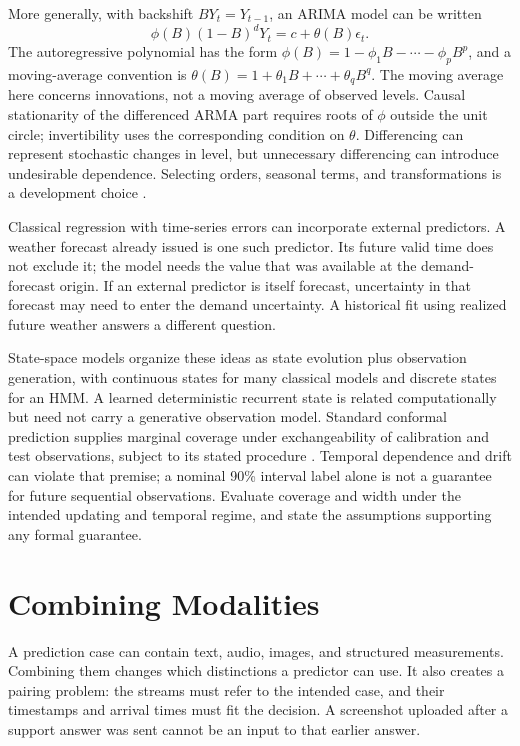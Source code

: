 More generally, with backshift $BY_t=Y_{t-1}$, an ARIMA model can be written
\[
 \phi(B)(1-B)^dY_t=c+\theta(B)\epsilon_t.
\]
The autoregressive polynomial has the form $\phi(B)=1-\phi_1B-\cdots-\phi_pB^p$, and a moving-average convention is $\theta(B)=1+\theta_1B+\cdots+\theta_qB^q$. The moving average here concerns innovations, not a moving average of observed levels. Causal stationarity of the differenced ARMA part requires roots of $\phi$ outside the unit circle; invertibility uses the corresponding condition on $\theta$. Differencing can represent stochastic changes in level, but unnecessary differencing can introduce undesirable dependence. Selecting orders, seasonal terms, and transformations is a development choice \citep{hyndman2021}.

Classical regression with time-series errors can incorporate external predictors. A weather forecast already issued is one such predictor. Its future valid time does not exclude it; the model needs the value that was available at the demand-forecast origin. If an external predictor is itself forecast, uncertainty in that forecast may need to enter the demand uncertainty. A historical fit using realized future weather answers a different question.

State-space models organize these ideas as state evolution plus observation generation, with continuous states for many classical models and discrete states for an HMM. A learned deterministic recurrent state is related computationally but need not carry a generative observation model. Standard conformal prediction supplies marginal coverage under exchangeability of calibration and test observations, subject to its stated procedure \citep{shafer2008,angelopoulos2023}. Temporal dependence and drift can violate that premise; a nominal 90\% interval label alone is not a guarantee for future sequential observations. Evaluate coverage and width under the intended updating and temporal regime, and state the assumptions supporting any formal guarantee.

\section{Combining Modalities}
\label{sec:multimodal-extension}

A prediction case can contain text, audio, images, and structured measurements. Combining them changes which distinctions a predictor can use. It also creates a pairing problem: the streams must refer to the intended case, and their timestamps and arrival times must fit the decision. A screenshot uploaded after a support answer was sent cannot be an input to that earlier answer.

